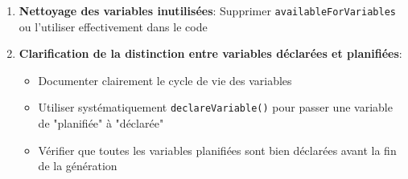 \documentclass[11pt,a4paper]{article}
\begin{document}
\begin{enumerate}
    \item \textbf{Nettoyage des variables inutilisées}: Supprimer \texttt{availableForVariables} ou l'utiliser effectivement dans le code
    
    \item \textbf{Clarification de la distinction entre variables déclarées et planifiées}:
    \begin{itemize}
        \item Documenter clairement le cycle de vie des variables
        \item Utiliser systématiquement \texttt{declareVariable()} pour passer une variable de "planifiée" à "déclarée"
        \item Vérifier que toutes les variables planifiées sont bien déclarées avant la fin de la génération
    \end{itemize}
\end{enumerate}



\clearpage
\printbibliography
\end{document}
